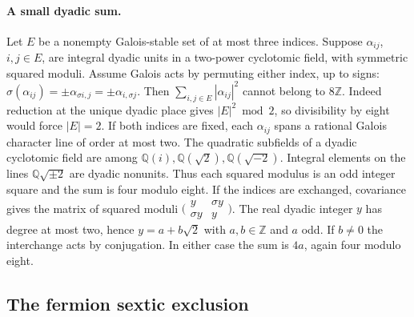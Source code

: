 \documentclass[11pt,a4paper]{article}
\numberwithin{equation}{section}
\begin{document}
\paragraph{A small dyadic sum.}
Let $E$ be a nonempty Galois-stable set of at most three indices.
Suppose $\alpha_{ij}$, $i,j\in E$, are integral dyadic units in a
two-power cyclotomic field, with symmetric squared moduli. Assume
Galois acts by permuting either index, up to signs:
$\sigma(\alpha_{ij})=\pm\alpha_{\sigma i,j}=\pm\alpha_{i,\sigma j}$.
Then $\sum_{i,j\in E}|\alpha_{ij}|^2$ cannot belong to $8\mathbb Z$.
Indeed reduction at the unique dyadic place gives $|E|^2\bmod2$,
so divisibility by eight would force $|E|=2$. If both indices are fixed,
each $\alpha_{ij}$ spans a rational Galois character line of order
at most two. The quadratic subfields of a dyadic cyclotomic field
are among $\mathbb Q(i),\mathbb Q(\sqrt2),\mathbb Q(\sqrt{-2})$.
Integral elements on the lines $\mathbb Q\sqrt{\pm2}$ are dyadic
nonunits. Thus each squared modulus is an odd integer square and the
sum is four modulo eight. If the indices are exchanged, covariance
gives the matrix of squared moduli
$\bigl(\begin{smallmatrix}y&\sigma y\\\sigma y&y\end{smallmatrix}\bigr)$.
The real dyadic integer $y$ has degree at most two, hence
$y=a+b\sqrt2$ with $a,b\in\mathbb Z$ and $a$ odd. If $b\ne0$ the
interchange acts by conjugation. In either case the sum is $4a$,
again four modulo eight.

\subsection{The fermion sextic exclusion}
\end{document}
